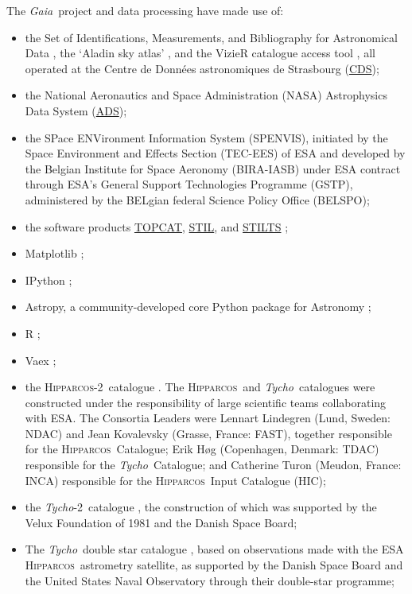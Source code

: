 \documentclass[longauth]{aa}
\newcommand\gaia{\textit{Gaia}\xspace}
\providecommand\hip{\textsc{Hipparcos\xspace}}
\providecommand\tyc{\textit{Tycho\xspace}}
\providecommand\tyctwo{\textit{Tycho}-2\xspace}
\begin{document}
\begin{appendix}
The \gaia\ project and data processing have made use of:
\begin{itemize}
\item the Set of Identifications, Measurements, and Bibliography for Astronomical Data \citep[SIMBAD,][]{2000AAS..143....9W}, the `Aladin sky atlas' \citep{2000A&AS..143...33B,2014ASPC..485..277B}, and the VizieR catalogue access tool \citep{2000A&AS..143...23O}, all operated at the Centre de Donn\'{e}es astronomiques de Strasbourg (\href{http://cds.u-strasbg.fr/}{CDS});
\item the National Aeronautics and Space Administration (NASA) Astrophysics Data System (\href{http://adsabs.harvard.edu/abstract_service.html}{ADS});
\item the SPace ENVironment Information System (SPENVIS), initiated by the Space Environment and Effects Section (TEC-EES) of ESA and developed by the Belgian Institute for Space Aeronomy (BIRA-IASB) under ESA contract through ESA’s General Support Technologies Programme (GSTP), administered by the BELgian federal Science Policy Office (BELSPO);
\item the software products \href{http://www.starlink.ac.uk/topcat/}{TOPCAT}, \href{http://www.starlink.ac.uk/stil}{STIL}, and \href{http://www.starlink.ac.uk/stilts}{STILTS} \citep{2005ASPC..347...29T,2006ASPC..351..666T};
\item Matplotlib \citep{Hunter:2007};
\item IPython \citep{PER-GRA:2007};  
\item Astropy, a community-developed core Python package for Astronomy \citep{2018AJ....156..123A};
\item R \citep{RManual};
\item Vaex \citep{2018A&A...618A..13B};
\item the \hip-2\ catalogue \citep{2007A&A...474..653V}. The \hip\ and \tyc\ catalogues were constructed under the responsibility of large scientific teams collaborating with ESA. The Consortia Leaders were Lennart Lindegren (Lund, Sweden: NDAC) and Jean Kovalevsky (Grasse, France: FAST), together responsible for the \hip\ Catalogue; Erik H{\o}g (Copenhagen, Denmark: TDAC) responsible for the \tyc\ Catalogue; and Catherine Turon (Meudon, France: INCA) responsible for the \hip\ Input Catalogue (HIC);  
\item the \tyctwo\ catalogue \citep{2000A&A...355L..27H}, the construction of which was supported by the Velux Foundation of 1981 and the Danish Space Board;
\item The \tyc\ double star catalogue \citep[TDSC,][]{2002A&A...384..180F}, based on observations made with the ESA \hip\ astrometry satellite, as supported by the Danish Space Board and the United States Naval Observatory through their double-star programme;

\end{itemize}
\end{appendix}
\end{document}
